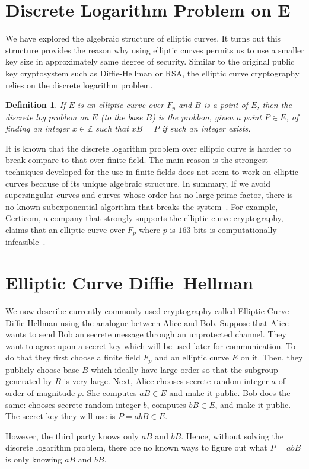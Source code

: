 \documentclass[11pt]{article}
\newtheorem{definition}{Definition}
\newcommand{\Z}{\ensuremath{\mathbb{Z}}}
\begin{document}
\section{Discrete Logarithm Problem on E}
We have explored the algebraic structure of elliptic curves. It turns out this structure provides the reason why using elliptic curves permits us to use a smaller key size in approximately same degree of security. Similar to the original public key cryptosystem such as Diffie-Hellman or RSA, the elliptic curve cryptography relies on the discrete logarithm problem.
\begin{definition}
If $E$ is an elliptic curve over $F_p$ and $B$ is a point of $E$, then the discrete log problem on $E$ (to the base $B$) is the problem, given a point $P \in E$, of finding an integer $x \in \Z$ such that $xB = P$ if such an integer exists.
\end{definition}
It is known that the discrete logarithm problem over elliptic curve is harder to break compare to that over finite field. The main reason is the strongest techniques developed for the use in finite fields does not seem to work on elliptic curves because of its unique algebraic structure. In summary, If we avoid supersingular curves and curves whose order has no large prime factor, there is no known subexponential algorithm that breaks the system~\cite{Neal}. For example, Certicom, a company that strongly supports the elliptic curve cryptography, claims that an elliptic curve over $F_p$ where $p$ is $163$-bits is computationally infeasible~\cite{Stein}.

\section{Elliptic Curve Diffie–Hellman}
We now describe currently commonly used cryptography called Elliptic Curve Diffie-Hellman using the analogue between Alice and Bob. Suppose that Alice wants to send Bob an secrete message through an unprotected channel. They want to agree upon a secret key which will be used later for communication. To do that they first choose a finite field $F_p$ and an elliptic curve $E$ on it. Then, they publicly choose base $B$ which ideally have large order so that the subgroup generated by $B$ is very large. Next, Alice chooses secrete random integer $a$ of order of magnitude $p$. She computes $aB \in E$ and make it public. Bob does the same: chooses secrete random integer $b$, computes $bB \in E$, and make it public. The secret key they will use is $P = abB \in E$.

However, the third party knows only $aB$ and $bB$. Hence, without solving the discrete logarithm problem, there are no known ways to figure out what $P = abB$ is only knowing $aB$ and $bB$.

{}

\end{document}
